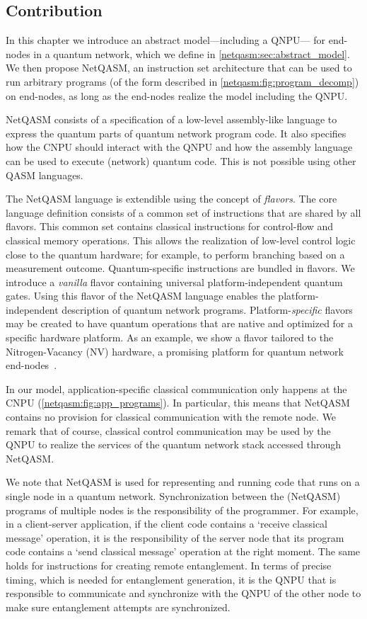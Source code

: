 \subsection{Contribution}
In this chapter we introduce an abstract model---including a \acf{QNPU}--- for end-nodes in a quantum network, which we define in \cref{netqasm:sec:abstract_model}.
We then propose \ac{NetQASM}, an instruction set architecture that can be used to run arbitrary programs (of the form described in \cref{netqasm:fig:program_decomp}) on end-nodes, as long as the end-nodes realize the model including the QNPU.

\ac{NetQASM} consists of a specification of a low-level assembly-like language to express the quantum parts of quantum network program code.
It also specifies how the \ac{CNPU} should interact with the \ac{QNPU} and how the assembly language can be used to execute (network) quantum code.
This is not possible using other QASM languages.

The \ac{NetQASM} language is extendible using the concept of \textit{flavors}.
The core language definition consists of a common set of instructions that are shared by all flavors.
This common set contains classical instructions for control-flow and classical memory operations.
This allows the realization of low-level control logic close to the quantum hardware;
for example, to perform branching based on a measurement outcome.
Quantum-specific instructions are bundled in flavors.
We introduce a \textit{vanilla} flavor containing universal platform-independent quantum gates.
Using this flavor of the \ac{NetQASM} language enables the platform-independent description of quantum network programs.
Platform-\textit{specific} flavors may be created to have quantum operations that are native and optimized for a specific hardware platform.
As an example, we show a flavor tailored to the Nitrogen-Vacancy (NV) hardware, a promising platform for quantum network end-nodes~\cite{Taminiau2014, hanson2021realization}.

In our model, application-specific classical communication only happens at the \ac{CNPU} (\cref{netqasm:fig:app_programs}).
In particular, this means that \ac{NetQASM} contains no provision for classical communication with the remote node.
We remark that of course, classical control communication may be used by the \ac{QNPU} to realize the services of the quantum network stack accessed through \ac{NetQASM}.

We note that \ac{NetQASM} is used for representing and running code that runs on a single node in a quantum network.
Synchronization between the (\ac{NetQASM}) programs of multiple nodes is the responsibility of the programmer.
For example, in a client-server application, if the client code contains a `receive classical message' operation, it is the responsibility of the server node that its program code contains a `send classical message' operation at the right moment.
The same holds for instructions for creating remote entanglement.
In terms of precise timing, which is needed for entanglement generation, it is the \ac{QNPU} that is responsible to communicate and synchronize with the \ac{QNPU} of the other node to make sure entanglement attempts are synchronized.

